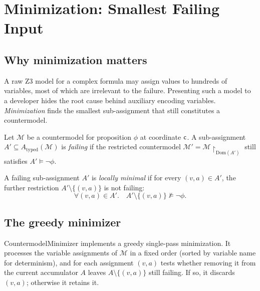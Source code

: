 \documentclass[11pt]{article}
\newcommand{\CMod}{\mathcal{M}}            %
\newcommand{\Dom}{\mathrm{Dom}}            %
\begin{document}
\section{Minimization: Smallest Failing Input}
\label{sec:minimization}

\subsection{Why minimization matters}

A raw Z3 model for a complex formula may assign values to hundreds of
variables, most of which are irrelevant to the failure.  Presenting
such a model to a developer hides the root cause behind auxiliary
encoding variables.  \emph{Minimization} finds the smallest
sub-assignment that still constitutes a countermodel.

\begin{definition}\label{def:failing}
Let $\CMod$ be a countermodel for proposition $\phi$ at coordinate
$\mathsf{c}$.  A sub-assignment $A' \subseteq A_{\mathrm{typed}}(\CMod)$
is \emph{failing} if the restricted countermodel
$\CMod' = \CMod\restriction_{\Dom(A')}$ still satisfies
$A' \models \neg\phi$.
\end{definition}

\begin{definition}\label{def:local-min}
A failing sub-assignment $A'$ is \emph{locally minimal} if for every
$(v, a) \in A'$, the further restriction $A' \setminus \{(v,a)\}$ is
not failing:
\[
  \forall (v,a) \in A'.\quad A' \setminus \{(v,a)\} \not\models \neg\phi.
\]
\end{definition}

\subsection{The greedy minimizer}

\textsf{CountermodelMinimizer} implements a greedy single-pass
minimization.  It processes the variable assignments of $\CMod$ in a
fixed order (sorted by variable name for determinism), and for each
assignment $(v, a)$ tests whether removing it from the current
accumulator $A$ leaves $A \setminus \{(v,a)\}$ still failing.  If so,
it discards $(v,a)$; otherwise it retains it.
\end{document}
